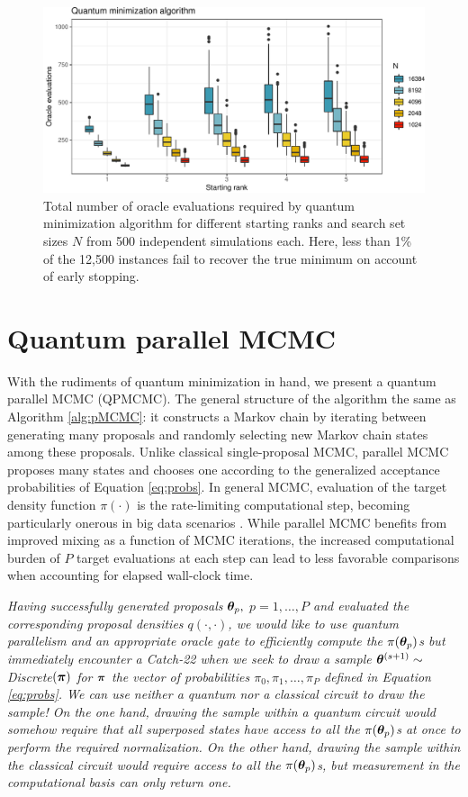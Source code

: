 \documentclass[12pt]{article} %
\begin{document}
 \begin{figure}[!t]
	\centering
	\includegraphics[width=0.9\linewidth]{qMinAlg.pdf}
	\caption{Total number of oracle evaluations required by quantum minimization algorithm \citep{durr1996quantum} for different starting ranks and search set sizes $N$ from 500 independent simulations each.  Here, less than 1\% of the 12,500 instances fail to recover the true minimum on account of early stopping.}\label{fig:qMinAlg}
\end{figure}

\section{Quantum parallel MCMC}

With the rudiments of quantum minimization in hand, we present a quantum parallel MCMC (QPMCMC). The general structure of the algorithm the same as Algorithm \ref{alg:pMCMC}: it constructs a Markov chain by iterating between generating many proposals and randomly selecting new Markov chain states among these proposals.  Unlike classical single-proposal MCMC, parallel MCMC proposes many states and chooses one according to the generalized acceptance probabilities of Equation \eqref{eq:probs}.
 In general MCMC, evaluation of the target density function $\pi(\cdot)$ is the rate-limiting computational step, becoming particularly onerous in big data scenarios \citep{massive}.  While parallel MCMC benefits from improved mixing as a function of MCMC iterations, the increased computational burden of $P$ target evaluations at each step can lead to less favorable comparisons when accounting for elapsed wall-clock time.
 
 \emph{Having successfully generated proposals $\boldsymbol{\theta}_p,$ $p=1,\dots,P$ and evaluated the corresponding proposal densities $q(\cdot,\cdot)$, we would like to use quantum parallelism and an appropriate oracle gate to efficiently compute the $\pi(\boldsymbol{\theta}_p)$s but immediately encounter a Catch-22 when we seek to draw a sample $\boldsymbol{\theta}^{(s+1)} \sim$ \emph{Discrete}$(\boldsymbol{\pi})$ for $\boldsymbol{\pi}$ the vector of probabilities $\pi_0,\pi_1,\dots,\pi_P$ defined in Equation \eqref{eq:probs}.  We can use neither a quantum nor a classical circuit to draw the sample! On the one hand, drawing the sample within a quantum circuit would somehow require that all superposed states have access to all the $\pi(\boldsymbol{\theta}_p)$s at once to perform the required normalization.  On the other hand, drawing the sample within the classical circuit would require access to all the $\pi(\boldsymbol{\theta}_p)$s, but measurement in the computational basis can only return one.}  
 
\end{document}
